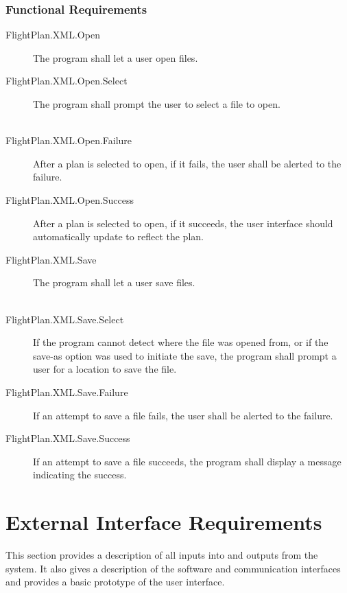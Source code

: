 \documentclass[12pt, letterpaper]{article}
\begin{document}
          \subsubsection{Functional Requirements}
            \begin{description}
              \item[FlightPlan.XML.Open] The program shall let a user open files. \\ 
              \item[FlightPlan.XML.Open.Select] The program shall prompt the user to select a file to open. \\ \
              \item[FlightPlan.XML.Open.Failure] After a plan is selected to open, if it fails, the user shall be alerted to the failure. \\ 
              \item[FlightPlan.XML.Open.Success] After a plan is selected to open, if it succeeds, the user interface should automatically update to reflect the plan. \\ 
              \item[FlightPlan.XML.Save] The program shall let a user save files. \\ \
              \item[FlightPlan.XML.Save.Select] If the program cannot detect where the file was opened from,
                         or if the save-as option was used to initiate the save, the program shall prompt a user for a location to save the file. \\
              \item[ FlightPlan.XML.Save.Failure] If an attempt to save a file fails, the user shall be alerted to the failure. \\ 
              \item[FlightPlan.XML.Save.Success] If an attempt to save a file succeeds, the program shall display a message indicating the success. \\ 
            \end{description}
          \newpage
\section{External Interface Requirements}
  This section provides a description of all inputs into and outputs from the system.
  It also gives a description of the software and communication interfaces and provides a basic prototype of the user interface.
\end{document}
